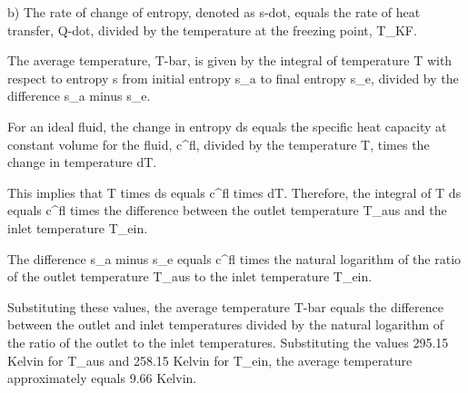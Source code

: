 b) The rate of change of entropy, denoted as s-dot, equals the rate of heat transfer, Q-dot, divided by the temperature at the freezing point, T_KF.

The average temperature, T-bar, is given by the integral of temperature T with respect to entropy s from initial entropy s_a to final entropy s_e, divided by the difference s_a minus s_e.

For an ideal fluid, the change in entropy ds equals the specific heat capacity at constant volume for the fluid, c^fl, divided by the temperature T, times the change in temperature dT.

This implies that T times ds equals c^fl times dT. Therefore, the integral of T ds equals c^fl times the difference between the outlet temperature T_aus and the inlet temperature T_ein.

The difference s_a minus s_e equals c^fl times the natural logarithm of the ratio of the outlet temperature T_aus to the inlet temperature T_ein.

Substituting these values, the average temperature T-bar equals the difference between the outlet and inlet temperatures divided by the natural logarithm of the ratio of the outlet to the inlet temperatures. Substituting the values 295.15 Kelvin for T_aus and 258.15 Kelvin for T_ein, the average temperature approximately equals 9.66 Kelvin.